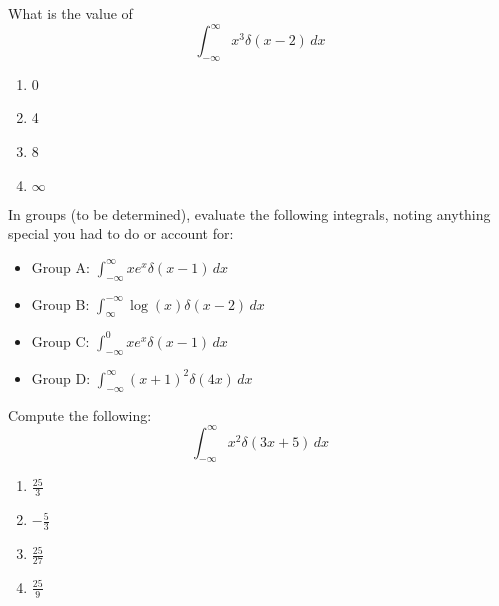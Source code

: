 \documentclass[pdf,aspectratio=169]{beamer}
\begin{document}
\begin{frame}{}
	What is the value of
	\[\int_{-\infty}^{\infty}x^3\delta(x-2)\,dx\]
	\begin{enumerate}
		\item 0
		\item 4
		\item \alert<2>{8}
		\item $\infty$
	\end{enumerate}
\end{frame}

\begin{frame}{}
	In groups (to be determined), evaluate the following integrals, noting anything special you had to do or account for:
	\begin{itemize}
		\item Group A: $\displaystyle \int_{-\infty}^{\infty} xe^x \delta(x-1)\,dx$\onslide<2>{$=e$}
		\item Group B: $\displaystyle \int_{\infty}^{-\infty} \log(x) \delta(x-2)\,dx$\onslide<2>{$=-\log(2)$}
		\item Group C: $\displaystyle \int_{-\infty}^{0} xe^x \delta(x-1)\,dx$\onslide<2>{$=0$}
		\item Group D: $\displaystyle \int_{-\infty}^{\infty} (x+1)^2 \delta(4x)\,dx$\onslide<2>{$=\frac{1}{4}$}
	\end{itemize}
\end{frame}

\begin{frame}{}
	Compute the following:
	\[\int_{-\infty}^{\infty}x^2 \delta(3x+5)\,dx\]
	\begin{enumerate}
		\item $\displaystyle \frac{25}{3}$
		\item $\displaystyle -\frac{5}{3}$
		\item \alert<2>{$\displaystyle \frac{25}{27}$}
		\item $\displaystyle \frac{25}{9}$
	\end{enumerate}
\end{frame}
\end{document}
